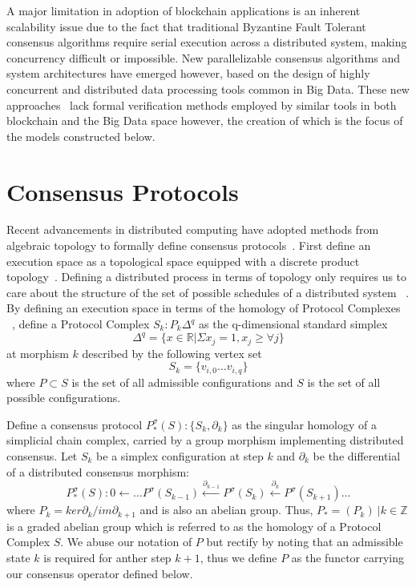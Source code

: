 \documentclass[runningheads]{llncs}
\begin{document}
A major limitation in adoption of blockchain applications is an inherent scalability issue due to the fact that traditional Byzantine Fault Tolerant consensus algorithms require serial execution across a distributed system, making concurrency difficult or impossible. New parallelizable consensus algorithms and system architectures have emerged however, based on the design of highly concurrent and distributed data processing tools common in Big Data. These new approaches~\cite{ref_url3,ref_url6} lack formal verification methods employed by similar tools in both blockchain and the Big Data space however, the creation of which is the focus of the models constructed below.

\section{Consensus Protocols}
Recent advancements in distributed computing have adopted methods from algebraic topology to formally define consensus protocols~\cite{ref_article1,ref_article2}. First define an execution space as a topological space equipped with a discrete product topology~\cite{ref_article3}. Defining a distributed process in terms of topology only requires us to care about the structure of the set of possible schedules of a distributed system ~\cite{ref_article4}. By defining an execution space in terms of the homology of Protocol Complexes ~\cite{ref_article2}, define a Protocol Complex $S_k: P_k{\Delta^q}$ as the q-dimensional standard simplex
\begin{equation}
\Delta^q = \{x \in \mathbb{R} | \Sigma x_j = 1, x_j \geq \forall j \}
\end{equation} 
at morphism $k$ described by the following vertex set
\begin{equation}
S_k = \{v_{i,0} \dots v_{i,q}\}
\end{equation}
where $P \subset S$ is the set of all admissible configurations and $S$ is the set of all possible configurations.

Define a consensus protocol $P^\sigma_{*}(S):\{S_k, \partial_k\}$ as the singular homology of a simplicial chain complex, carried by a group morphism implementing distributed consensus. Let $S_k$ be a simplex configuration at step $k$ and $\partial_k$ be the differential of a distributed consensus morphism:
\begin{equation}
P^\sigma_{*}(S): 0 \leftarrow \dots P^\sigma(S_{k-1})\xleftarrow {\partial_{k-1}} P^\sigma(S_{k})\xleftarrow {\partial_{k}} P^\sigma(S_{k+1}) \dots
\end{equation}
where $P_k = ker \partial_k / im \partial_{k+1}$ and is also an abelian group. Thus, $P_*= (P_k) \ | k \in \mathbb{Z}$ is a graded abelian group which is referred to as the homology of a Protocol Complex $S$. We abuse our notation of $P$ but rectify by noting that an admissible state $k$ is required for anther step $k + 1$, thus we define $P$ as the functor carrying our consensus operator defined below.
\end{document}
